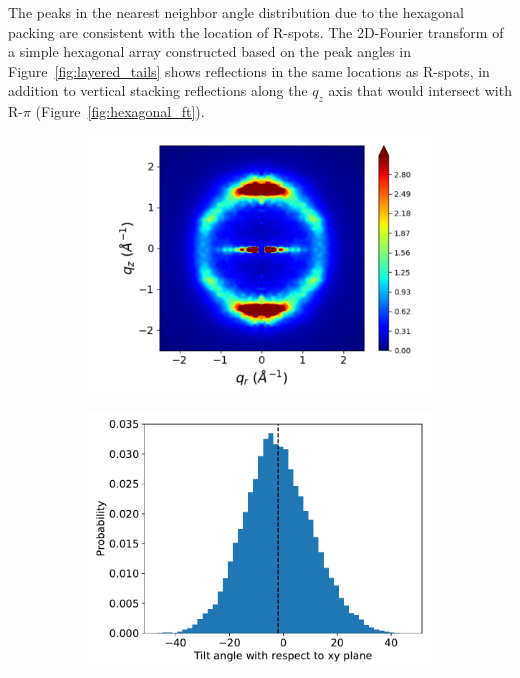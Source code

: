 \documentclass[journal=jpcbfk,manuscript=article]{achemso}
\begin{document}
  The peaks in the nearest neighbor angle distribution due to the hexagonal
  packing are consistent with the location of R-spots. The 2D-Fourier transform
  of a simple hexagonal array constructed based on the peak angles in
  Figure~\ref{fig:layered_tails} shows reflections in the same locations as
  R-spots, in addition to vertical stacking reflections along the $q_z$ axis that
  would intersect with R-$\pi$ (Figure~\ref{fig:hexagonal_ft}). 

  \begin{figure}[!htb]
  \begin{subfigure}{0.32\linewidth}
  	\centering
  	\includegraphics[width=\textwidth]{rzplot_layered_280K_jet.pdf}
  	\caption{}\label{fig:sandwiched280K}
  \end{subfigure}
  \begin{subfigure}{0.32\linewidth}
    \includegraphics[width=\textwidth]{tilt_dist.pdf}

\end{subfigure}
\end{figure}
\end{document}
